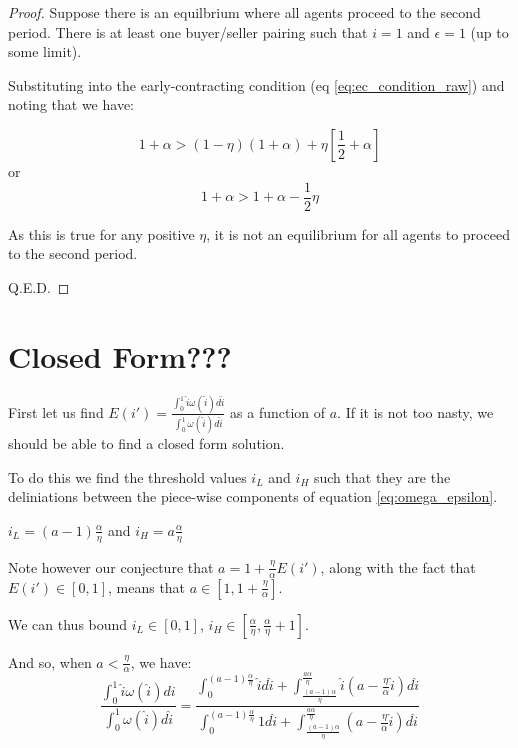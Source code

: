 \documentclass[WP]{AEA}
\begin{document}
\begin{proof}
	Suppose there is an equilbrium where all agents proceed to the second period. There is at least one buyer/seller pairing such that $i = 1$ and $\epsilon = 1$ (up to some limit).
	
	Substituting into the early-contracting condition (eq \ref{eq:ec_condition_raw}) and noting that we have:
	
	\begin{equation*}
	 1+\alpha >(1-\eta)(1+\alpha ) + \eta  \left[ \frac{1}{2} + \alpha \right] 
	\end{equation*}
or	
	\begin{equation*}
	1+\alpha > 1+\alpha   -  \frac{1}{2}\eta   
	\end{equation*}
	
	As this is true for any positive $\eta$, it is not an equilibrium for all agents to proceed to the second period.
	
	Q.E.D.
\end{proof}	

\section{Closed Form???}

First let us find  $E(i')=\frac{\int_0^1 \hat{i} \omega(\hat{i})d\hat{i}}{\int_0^1  \omega(\hat{i}) d\hat{i}}$ as a function of $a$.  If it is not too nasty, we should be able to find a closed form solution.
	
To do this we find the threshold values $i_L$ and  $i_H $ such that they are the deliniations between the piece-wise components of equation \ref{eq:omega_epsilon}.

$i_L = (a-1)\frac{\alpha}{\eta}$ and 
$i_H = a\frac{\alpha}{\eta}$

Note however our conjecture that $a = 1+\frac{\eta}{\alpha}E(i')$, along with the fact that $E(i') \in [0,1]$, means that $a \in[1,1+\frac{\eta}{\alpha}]$.

We can thus bound $i_L \in [0,1]$, $i_H \in [\frac{\alpha}{\eta}, \frac{\alpha}{\eta} +1]$.

And so, when $a<\frac{\eta}{\alpha}$, we have:
\begin{equation} \label{eq:E_solved_small_a}
 \frac{\int_0^1 \hat{i} \omega(\hat{i}) di}{\int_0^1  \omega(\hat{i}) d\hat{i}} 
 =  \frac{\int_0^{(a-1)\frac{\alpha}{\eta}}  \hat{i} d\hat{i} + 
\int_{\frac{(a-1)\alpha}{\eta}}^{\frac{a\alpha}{\eta}}  \hat{i} (a - \frac{\eta}{\alpha}\hat{i}) d\hat{i} }{\int_0^{(a-1)\frac{\alpha}{\eta}} 1 d\hat{i} + 
\int_{\frac{(a-1)\alpha}{\eta}}^{\frac{a\alpha}{\eta}}  (a - \frac{\eta}{\alpha}\hat{i}) d\hat{i} } 
\end{equation}
\end{document}
